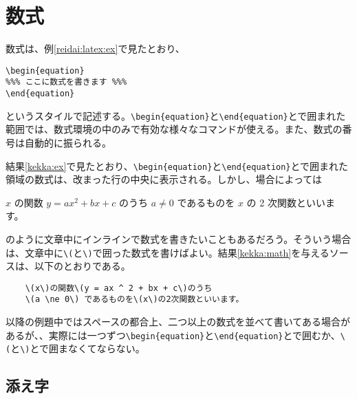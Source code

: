 \section{数式}
\label{sec:latex:math}

数式は、例\ref{reidai:latex:ex}で見たとおり、
\begin{reidai}
    \begin{verbatim}
\begin{equation}
%%% ここに数式を書きます %%%
\end{equation}
\end{verbatim}
\end{reidai} \noindent
というスタイルで記述する。\verb|\begin{equation}|と\verb|\end{equation}|とで囲まれた範囲では、数式環境の中のみで有効な様々なコマンドが使える。また、数式の番号は自動的に振られる。

結果\ref{kekka:ex}で見たとおり、\verb|\begin{equation}|と\verb|\end{equation}|とで囲まれた領域の数式は、改まった行の中央に表示される。しかし、場合によっては
\addtocounter{reidai}{1}
\begin{kekka}
    \label{kekka:math}
    \(x\) の関数 \(y = ax ^ 2 + bx + c\) のうち
    \(a \ne 0\) であるものを \(x\) の 2 次関数といいます。
\end{kekka} \noindent
のように文章中にインラインで数式を書きたいこともあるだろう。そういう場合は、文章中に\texttt{\textbackslash(}と\texttt{\textbackslash)}で囲った数式を書けばよい。結果\ref{kekka:math}を与えるソースは、以下のとおりである。\addtocounter{reidai}{-1}
\begin{reidai}
    \begin{verbatim}
    \(x\)の関数\(y = ax ^ 2 + bx + c\)のうち
    \(a \ne 0\) であるものを\(x\)の2次関数といいます。
\end{verbatim}
\end{reidai} \noindent
以降の例題中ではスペースの都合上、二つ以上の数式を並べて書いてある場合があるが、、実際には一つずつ\verb|\begin{equation}|と\verb|\end{equation}|とで囲むか、\texttt{\textbackslash(}と\texttt{\textbackslash)}とで囲まなくてならない。

\subsection{添え字}
\label{sec:latex:index}

